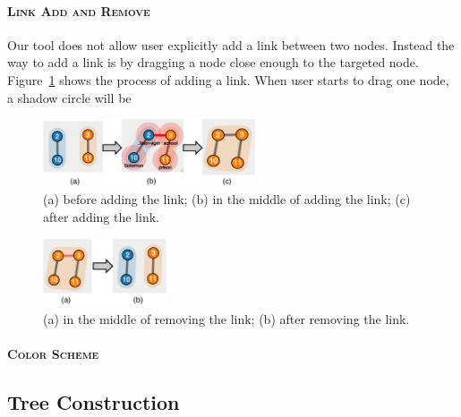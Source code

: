 \paragraph{\textsc{Link Add and Remove}\\}
Our tool does not allow user explicitly add a link between two nodes. Instead the way to add a link is by dragging a node close enough to the targeted node. Figure~\ref{fig:addlink} shows the process of adding a link. When user starts to drag one node, a shadow circle will be 

\begin{figure}[th]
\begin{center}
\includegraphics[height=2cm]{figs/addlink.pdf}
\caption{(a) before adding the link; (b) in the middle of adding the link; (c) after adding the link.}
\label{fig:addlink}
\end{center}
\end{figure}

\begin{figure}[th]
\begin{center}
\includegraphics[height=2cm]{figs/removelink.pdf}
\caption{(a) in the middle of removing the link; (b) after removing the link.}
\label{fig:rmlink}
\end{center}
\end{figure}

\paragraph{\textsc{Color Scheme}\\}

\subsection{Tree Construction}

